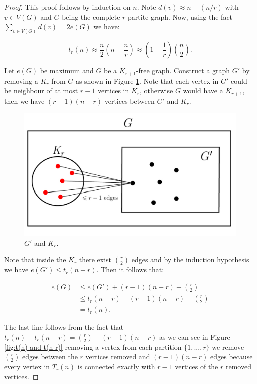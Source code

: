 \documentclass[12pt,twoside,a4paper,bibliography=totocnumbered]{book}
\numberwithin{equation}{section}
\theoremstyle{remark}
\begin{document}
\begin{proof}
This proof follows by induction on $n$. Note $d(v) \approx n-(n/r)$ with $v \in V(G)$ and $G$ being the complete $r$-partite graph. Now, using the fact $\sum_{v\in V(G)} d(v) = 2 e(G)$ we have:

$$ t_r(n) \approx \frac{n}{2}\left(n-\frac{n}{r}\right) \approx \left(1-\frac{1}{r}\right) \binom{n}{2}.$$


 Let $e(G)$ be maximum and $G$ be a $K_{r+1}$-free graph. Construct a graph $G'$ by removing a $K_r$ from $G$ as shown in Figure \ref{fig:G'andKr}. Note that each vertex in $G'$ could be neighbour of at most $r-1$ vertices in $K_r$, otherwise $G$ would have a $K_{r+1}$, then we have $(r-1)(n-r)$ vertices between $G'$ and $K_r$.
 
 \begin{figure}[H]
     \centering
     \includegraphics[scale=1]{Figuras/Kr+1-livre-prova-turan.jpg}
     \caption{$G'$ and $K_r$.}
     \label{fig:G'andKr}
\end{figure}

Note that inside the $K_r$ there exist $\binom{r}{2}$ edges and by the induction hypothesis we have $e(G') \leq t_r(n-r)$. Then it follows that:

\begin{align*}
e(G) &\leq e(G') + (r-1)(n-r) + \binom{r}{2}\\
&\leq t_r(n-r) +(r-1)(n-r) + \binom{r}{2}\\
&= t_r(n).
\end{align*}

The last line follows from the fact that $t_r(n) - t_r(n-r) = \binom{r}{2} + (r-1)(n-r)$ as we can see in Figure \ref{fig:t(n)-and-t(n-r)} removing a vertex from each partition $\{1,...,r\}$ we remove $\binom{r}{2}$ edges between the $r$ vertices removed and $(r-1)(n-r)$ edges  because every vertex in $T_r(n)$ is connected exactly with $r-1$ vertices of the $r$ removed vertices.   


\end{proof}
\end{document}
